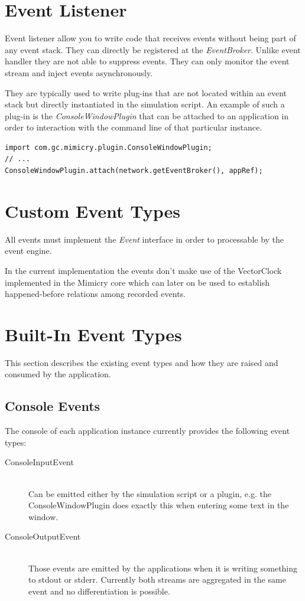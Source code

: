 \documentclass[a4paper,oneside]{book}
\begin{document}
\section{Event Listener}
Event listener allow you to write code that receives events without being part of any event stack. They can directly be registered at the \textit{EventBroker}. Unlike event handler they are not able to suppress events. They can only monitor the event stream and inject events asynchronously.

They are typically used to write plug-ins that are not located within an event stack but directly instantiated in the simulation script. An example of such a plug-in is the \textit{ConsoleWindowPlugin} that can be attached to an application in order to interaction with the command line of that particular instance.
\begin{lstlisting}
import com.gc.mimicry.plugin.ConsoleWindowPlugin;
// ...
ConsoleWindowPlugin.attach(network.getEventBroker(), appRef);
\end{lstlisting}


\section{Custom Event Types}
All events must implement the \textit{Event} interface in order to processable by the event engine.

In the current implementation the events don't make use of the VectorClock implemented in the Mimicry core which can later on be used to establish happened-before relations among recorded events.

\section{Built-In Event Types}
This section describes the existing event types and how they are raised and consumed by the application.

\subsection{Console Events}
The console of each application instance currently provides the following event types:
\begin{description}
\item[ConsoleInputEvent] \hfill \\
Can be emitted either by the simulation script or a plugin, e.g. the ConsoleWindowPlugin does exactly this when entering some text in the window.

\item[ConsoleOutputEvent] \hfill \\
Those events are emitted by the applications when it is writing something to stdout or stderr. Currently both streams are aggregated in the same event and no differentiation is possible.
\end{description}
\end{document}
